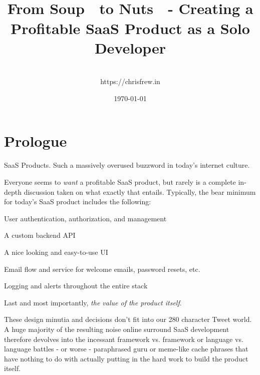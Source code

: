 \documentclass[a4paper,
                             oneside,
                             BCOR1.0cm,
                             DIV11,
                             parskip=full,
                             11pt]{scrbook}
\begin{document}
\title{\\\small{From Soup 🍜 to Nuts 🥜 - Creating a Profitable SaaS Product as a Solo Developer}}
\author{
    \\https://chrisfrew.in
}
\date{\today}

\maketitle
\tableofcontents

\chapter*{Prologue}\label{cap:primer}


SaaS Products. Such a massively overused buzzword in today's internet culture. 

Everyone seems to \textit{want} a profitable SaaS product, but rarely is a complete in-depth discussion taken on what exactly that entails. Typically, the bear minimum for today's SaaS product includes the following:

\begin{arrows}
\item User authentication, authorization, and management
\item A custom backend API
\item A nice looking and easy-to-use UI
\item Email flow and service for welcome emails, password resets, etc.
\item Logging and alerts throughout the entire stack
\item Last and most importantly, \textit{the value of the product itself}. 
\end{arrows}

These design minutia and decisions don't fit into our 280 character Tweet world. A huge majority of the resulting noise online surround SaaS development therefore devolves into the incessant framework vs. framework or language vs. language battles - or worse - paraphrased guru or meme-like cache phrases that have nothing to do with actually putting in the hard work to build the product itself.
\end{document}

